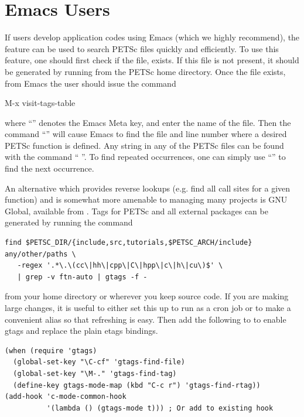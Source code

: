 {{{\section{Emacs Users}  \label{sec_emacs}

 
If users develop application codes  using Emacs (which we
highly recommend), the  feature can be used to search PETSc
files quickly and efficiently.  To use this feature, one should
first check if the file,
 exists.  If this file is
not present, it should be generated by
running   from the PETSc home directory.
Once the file exists, from
Emacs the user should issue
the command
\begin{tabbing}
 M-x visit-tags-table
\end{tabbing}
 where ``''
denotes the Emacs Meta key, and enter the
name of the  file. Then the command ``'' will cause Emacs
to find the file and line number where a desired PETSc function
is defined.  Any string in any of the PETSc files can be found with the
command `` ''. To find repeated occurrences,
one can simply use ``'' to find the next occurrence.

An alternative which provides reverse lookups (e.g. find all call sites for a given function) and is somewhat more amenable to managing many projects is GNU Global, available from .
Tags for PETSc and all external packages can be generated by running the command
\begin{verbatim}
find $PETSC_DIR/{include,src,tutorials,$PETSC_ARCH/include} any/other/paths \
   -regex '.*\.\(cc\|hh\|cpp\|C\|hpp\|c\|h\|cu\)$' \
   | grep -v ftn-auto | gtags -f -
\end{verbatim}
from your home directory or wherever you keep source code.
If you are making large changes, it is useful to either set this up to run as a cron job or to make a convenient alias so that refreshing is easy.
Then add the following to \trl{~/.emacs} to enable gtags and replace the plain etags bindings.
\begin{verbatim}
(when (require 'gtags)
  (global-set-key "\C-cf" 'gtags-find-file)
  (global-set-key "\M-." 'gtags-find-tag)
  (define-key gtags-mode-map (kbd "C-c r") 'gtags-find-rtag))
(add-hook 'c-mode-common-hook
          '(lambda () (gtags-mode t))) ; Or add to existing hook
\end{verbatim}

}}}
